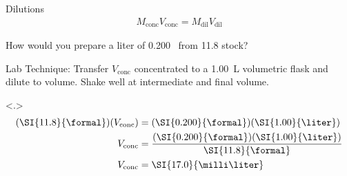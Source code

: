 \documentclass[notes=only]{beamer}
\begin{document}
\begin{frame}[t]{Dilutions}
	\begin{align*}
		M_\text{conc} V_\text{conc} = M_\text{dil} V_\text{dil}
	\end{align*}

	How would you prepare a liter of \SI{0.200}{\formal}~ from
	\SI{11.8}{\formal} stock?

	\pause


	\begin{block}{Lab Technique:}
		Transfer $V_\text{conc}$ concentrated  to a
		\SI{1.00}{\liter} volumetric flask and dilute to volume. Shake
		well at intermediate and final volume.
	\end{block}

	{
	\begin{align*}
		(\SI{11.8}{\formal})(V_\text{conc}) &=
		(\SI{0.200}{\formal})(\SI{1.00}{\liter}) \\
		V_\text{conc} &=
		\dfrac{(\SI{0.200}{\formal})(\SI{1.00}{\liter})}{\SI{11.8}{\formal}} \\
		V_\text{conc} &= \SI{17.0}{\milli\liter}
	\end{align*}
	}
\end{frame}
\end{document}
